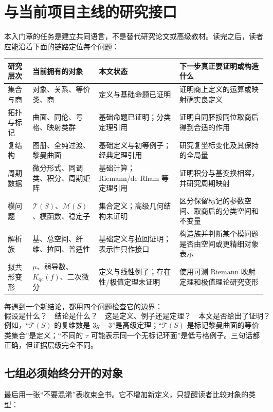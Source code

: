 \documentclass[UTF8,fontset=none,a4paper,11pt]{ctexart}
\theoremstyle{foundation-definition}
\theoremstyle{foundation-theorem}
\theoremstyle{foundation-proposition}
\theoremstyle{foundation-example}
\theoremstyle{foundation-remark}
\theoremstyle{foundation-theorem}
\newcommand{\T}{\mathcal T}
\newcommand{\M}{\mathcal M}
\begin{document}
\clearpage
\section{与当前项目主线的研究接口}

本入门章的任务是建立共同语言，不是替代研究论文或高级教材。读完之后，读者应能沿着下面的链路定位每个问题：

{\small
\setlength{\tabcolsep}{2pt}
\begin{longtable}{p{}p{}p{}p{}}
\toprule
研究层次 & 当前拥有的对象 & 本文状态 & 下一步真正要证明或构造什么 \\
\midrule
集合与商 & 对象、关系、等价类、商 & 定义与基础命题已证明 & 证明商上定义的运算或映射确实良定义 \\
拓扑与标记 & 曲面、同伦、亏格、映射类群 & 基础命题已证明；分类定理引用 & 证明自同胚按同位取商后得到合适的作用 \\
复结构 & 图册、全纯过渡、黎曼曲面 & 基础定义与初等例子；经典定理引用 & 研究复坐标变化及其保持的全局量 \\
周期数据 & 微分形式、同调类、积分、周期矩阵 & 基础计算；Riemann/de Rham 等定理引用 & 证明积分与基变换相容，并研究周期映射 \\
模问题 & \(\T(S)\)、\(\M(S)\)、模函数、稳定子 & 集合定义；高级几何结构未证明 & 区分保留标记的参数空间、取商后的分类空间和不变量 \\
解析族 & 基、总空间、纤维、拉回、普适性 & 基础定义与拉回证明；表示性只作接口 & 构造族并判断某个模问题是否由空间或更精细对象表示 \\
拟共形变形 & \(\mu\)、弱导数、\(K_{\mathrm{qc}}(f)\)、二次微分 & 定义与线性例子；存在性/极值定理未证明 & 使用可测 Riemann 映射定理和极值理论研究变形 \\
\bottomrule
\end{longtable}
}

每遇到一个新结论，都用四个问题检查它的边界：
\[
\text{假设是什么？}\quad
\text{结论是什么？}\quad
\text{这是定义、例子还是定理？}\quad
\text{本文是否给出了证明？}
\]
例如，“\(\T(S)\) 的复维数是 \(3g-3\)”是高级定理；“\(\T(S)\) 是标记黎曼曲面的等价类集合”是定义；“不同的 \(\tau\) 可能表示同一个无标记环面”是低亏格例子。三句话都正确，但证据层级完全不同。

\subsection{七组必须始终分开的对象}

最后用一张“不要混淆”表收束全书。它不增加新定义，只提醒读者比较对象的类型：
\end{document}
